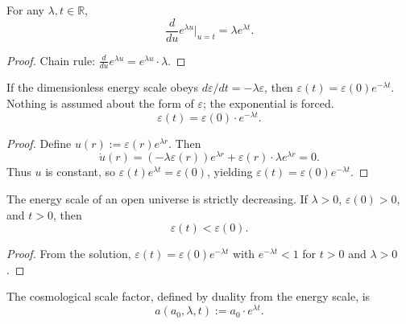 \begin{theorem}
For any $\lambda, t \in \mathbb{R}$,
\begin{equation}
\frac{d}{du} e^{\lambda u}\bigg|_{u=t} = \lambda e^{\lambda t} .
\end{equation}
\end{theorem}

\begin{proof}
Chain rule: $\frac{d}{du} e^{\lambda u} = e^{\lambda u} \cdot \lambda$.
\end{proof}

\begin{theorem}
If the dimensionless energy scale obeys $d\varepsilon/dt = -\lambda \varepsilon$, then $\varepsilon(t) = \varepsilon(0) e^{-\lambda t}$. Nothing is assumed about the form of $\varepsilon$; the exponential is forced.
\begin{equation}
\varepsilon(t) = \varepsilon(0) \cdot e^{-\lambda t} .
\end{equation}
\end{theorem}

\begin{proof}
Define $u(r) := \varepsilon(r) e^{\lambda r}$. Then
\begin{equation}
\dot{u}(r) = (-\lambda \varepsilon(r)) e^{\lambda r} + \varepsilon(r) \cdot \lambda e^{\lambda r} = 0 .
\end{equation}
Thus $u$ is constant, so $\varepsilon(t) e^{\lambda t} = \varepsilon(0)$, yielding $\varepsilon(t) = \varepsilon(0) e^{-\lambda t}$.
\end{proof}

\begin{theorem}
The energy scale of an open universe is strictly decreasing. If $\lambda > 0$, $\varepsilon(0) > 0$, and $t > 0$, then
\begin{equation}
\varepsilon(t) < \varepsilon(0) .
\end{equation}
\end{theorem}

\begin{proof}
From the solution, $\varepsilon(t) = \varepsilon(0) e^{-\lambda t}$ with $e^{-\lambda t} < 1$ for $t > 0$ and $\lambda > 0$.
\end{proof}

\begin{definition}
The cosmological scale factor, defined by duality from the energy scale, is
\begin{equation}
a(a_0, \lambda, t) := a_0 \cdot e^{\lambda t} .
\end{equation}
\end{definition}

